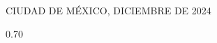 \documentclass[11pt,twoside]{book}
\begin{document}
\begin{toexclude}
\begin{titlepage}
\begin{center}
		{\large CIUDAD DE M\'EXICO, DICIEMBRE DE 2024}
		
	
	\end{center}
\end{titlepage}
%
%
%
%

%
%
%
{	
	\hypersetup{linkcolor=black}
	\begin{spacing}{0.70}
    \tableofcontents
	\end{spacing}	
	
}
\setlength{\parskip}{1mm}


\end{toexclude}
\end{document}
